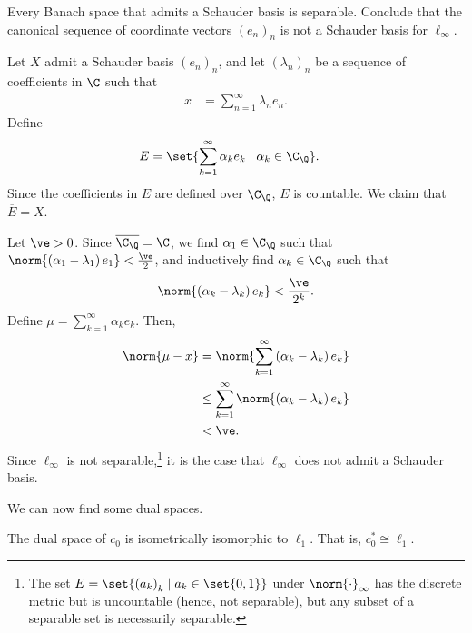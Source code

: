 \documentclass[10pt]{mypackage}
\begin{document}
\begin{exercise}
  Every Banach space that admits a Schauder basis is separable. Conclude that the canonical sequence of coordinate vectors $\left(e_n\right)_n$ is not a Schauder basis for $\ell_{\infty}$.
\end{exercise}
\begin{solution}
  Let $X$ admit a Schauder basis $\left(e_n\right)_n$, and let $\left(\lambda_n\right)_n$ be a sequence of coefficients in $\C$ such that
  \begin{align*}
    x &= \sum_{n=1}^{\infty}\lambda_ne_n.
  \end{align*}
  Define
  \begin{align*}
    E &= \set{\sum_{k=1}^{\infty}\alpha_ke_k\mid \alpha_k\in \C_{\Q}}.
  \end{align*}
  Since the coefficients in $E$ are defined over $\C_{\Q}$, $E$ is countable. We claim that $\overline{E} = X$.\newline

  Let $\ve > 0$. Since $\overline{\C_{\Q}} = \C$, we find $\alpha_1\in \C_{\Q}$ such that $\norm{\left(\alpha_1 - \lambda_1\right)e_1} < \frac{\ve}{2}$, and inductively find $\alpha_k\in \C_{\Q}$ such that
  \begin{align*}
    \norm{\left(\alpha_k - \lambda_k\right)e_k} < \frac{\ve}{2^k}.
  \end{align*}
  Define $\mu = \sum_{k=1}^{\infty}\alpha_ke_k$. Then,
  \begin{align*}
    \norm{\mu - x} &= \norm{\sum_{k=1}^{\infty}\left(\alpha_k - \lambda_k\right)e_k}\\
                   &\leq \sum_{k=1}^{\infty}\norm{\left(\alpha_k - \lambda_k\right)e_k}\\
                   &< \ve.
  \end{align*}
  Since $\ell_{\infty}$ is not separable,\footnote{The set $E = \set{\left(a_k\right)_k\mid a_k\in \set{0,1}}$ under $\norm{\cdot}_{\infty}$ has the discrete metric but is uncountable (hence, not separable), but any subset of a separable set is necessarily separable.} it is the case that $\ell_{\infty}$ does not admit a Schauder basis.
\end{solution}
We can now find some dual spaces.
\begin{proposition}
  The dual space of $c_0$ is isometrically isomorphic to $\ell_{1}$. That is, $c_0^{\ast} \cong \ell_1$.
\end{proposition}
\end{document}
